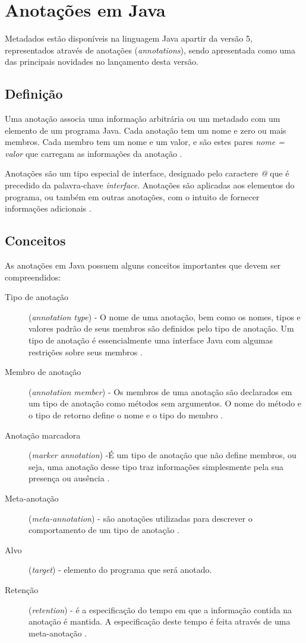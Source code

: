 \documentclass[tc,openright]{iiufrgs}
\begin{document}
\section{Anotações em Java}
Metadados estão disponíveis na linguagem Java apartir da versão 5,  representados através de anotações (\textit{annotations}), sendo apresentada como uma das principais novidades no lançamento desta versão.
\subsection{Definição}

Uma anotação associa uma informação arbitrária ou um metadado com um elemento de um programa Java. Cada anotação tem um nome e zero ou mais membros. Cada membro tem um nome e um valor, e são
estes pares \textit{nome = valor} que carregam as informações da anotação \cite{flanagan2005java}.

Anotações são um tipo especial de interface, designado pelo caractere \textit{@} que é precedido da palavra-chave \textit{interface}. Anotações são aplicadas aos elementos do programa, ou também em outras anotações, com o intuito de fornecer informações adicionais \cite{arnold2000java}.

\subsection{Conceitos}

As anotações em Java possuem alguns conceitos importantes que devem ser compreendidos: 

\begin{description}
\item [Tipo de anotação] (\textit{annotation type}) - O nome de uma anotação, bem como os nomes, tipos e valores padrão de seus membros são definidos pelo tipo de anotação. Um tipo de anotação é essencialmente uma interface Java com algumas restrições sobre seus membros \cite{flanagan2005java}.
\item [Membro de anotação] (\textit{annotation member}) - Os membros de uma anotação são declarados em um tipo de anotação como métodos sem argumentos. O nome do método e o tipo de retorno define o nome e o
tipo do membro \cite{flanagan2005java}.
\item [Anotação marcadora] (\textit{marker annotation}) -É um tipo de anotação que não define membros, ou seja, uma anotação desse tipo traz informações simplesmente pela sua presença ou ausência \cite{flanagan2005java}.
\item [Meta-anotação] (\textit{meta-annotation}) - são anotações utilizadas para descrever o comportamento de um tipo de anotação \cite{horstmann2004core}.
\item [Alvo] (\textit{target}) - elemento do programa que será anotado.
\item [Retenção] (\textit{retention}) - é a especificação do tempo em que a informação contida na anotação é mantida. A especificação deste tempo é feita através de uma meta-anotação \cite{flanagan2005java}.
\end{description}
\end{document}
